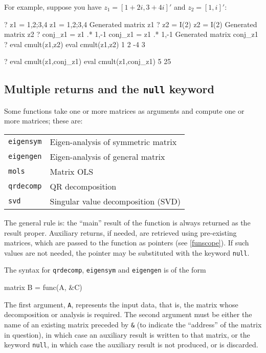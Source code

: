 For example, suppose you have $z_1 = [ 1 + 2i , 3 + 4i ]'$ and $z_2 =
[ 1, i ]'$:

\begin{code}
? z1 = {1,2;3,4}
 z1 = {1,2;3,4}
Generated matrix z1
? z2 = I(2)
 z2 = I(2)
Generated matrix z2
? conj_z1 = z1 .* {1,-1}
 conj_z1 = z1 .* {1,-1}
Generated matrix conj_z1
? eval cmult(z1,z2)
 eval cmult(z1,z2)
   1    2 
  -4    3 

? eval cmult(z1,conj_z1)
 eval cmult(z1,conj_z1)
   5 
  25 
\end{code}

\subsection{Multiple returns and the \texttt{null} keyword}
\label{matrix-multiples}

Some functions take one or more matrices as arguments and compute one
or more matrices; these are:

\begin{center}
\begin{tabular}{ll}
\texttt{eigensym} & Eigen-analysis of symmetric matrix \\
\texttt{eigengen} & Eigen-analysis of general matrix \\
\texttt{mols}     & Matrix OLS \\
\texttt{qrdecomp} & QR decomposition \\
\texttt{svd}      & Singular value decomposition (SVD) 
\end{tabular}
\end{center}

The general rule is: the ``main'' result of the function is always
returned as the result proper. Auxiliary returns, if needed, are
retrieved using pre-existing matrices, which are passed to the
function as pointers (see \ref{funscope}). If such values are not
needed, the pointer may be substituted with the keyword \texttt{null}.

The syntax for \texttt{qrdecomp}, \texttt{eigensym} and
\texttt{eigengen} is of the form
%
\begin{code}
matrix B = func(A, &C)
\end{code}
%
The first argument, \texttt{A}, represents the input data, that is,
the matrix whose decomposition or analysis is required.  The second
argument must be either the name of an existing matrix preceded by
\verb+&+ (to indicate the ``address'' of the matrix in question), in
which case an auxiliary result is written to that matrix, or the
keyword \texttt{null}, in which case the auxiliary result is not
produced, or is discarded.

